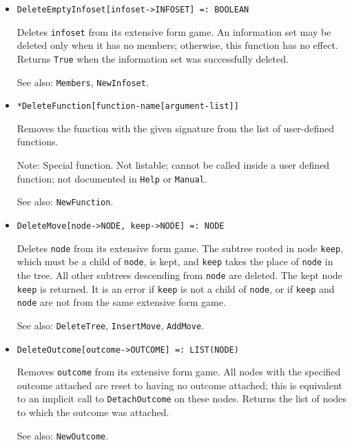 \begin{itemize}
\item{}
\protect \large \begin{verbatim}
DeleteEmptyInfoset[infoset->INFOSET] =: BOOLEAN
\end{verbatim}\normalsize

\bd
Deletes \verb+infoset+ from its extensive form game.  An information set
may be deleted only when it has no members; otherwise, this function has
no effect.  Returns \verb+True+ when the information set was successfully
deleted.
\item [See also:] \verb+Members+, \verb+NewInfoset+.
\ed

\item{}
\protect \large \begin{verbatim}
*DeleteFunction[function-name[argument-list]]
\end{verbatim}\normalsize

\bd
Removes the function with the given signature
from the list of user-defined functions.
\item [Note:] Special function. Not listable; cannot be called inside
a user defined function; not documented in \verb+Help+ or \verb+Manual+.  
\item [See also:] \verb+NewFunction+.
\ed

\item{}
\protect \large \begin{verbatim}
DeleteMove[node->NODE, keep->NODE] =: NODE
\end{verbatim}\normalsize

\bd
Deletes \verb+node+ from its extensive form game.  The
subtree rooted in node \verb+keep+, which must be a child of
\verb+node+, is kept, and \verb+keep+ takes the place of \verb+node+ in
the tree.  All other subtrees descending from \verb+node+ are deleted.
The kept node \verb+keep+ is returned.  It is an error if \verb+keep+
is not a child of \verb+node+, or if \verb+keep+ and \verb+node+ are not
from the same extensive form game.
\item [See also:] \verb+DeleteTree+, \verb+InsertMove+, \verb+AddMove+.
\ed

\item{}
\protect \large \begin{verbatim}
DeleteOutcome[outcome->OUTCOME] =: LIST(NODE)
\end{verbatim}\normalsize

\bd
Removes \verb+outcome+ from its extensive
form game.  All nodes with the specified outcome attached are reset to
having no outcome attached; this is equivalent to an implicit call to
\verb+DetachOutcome+ on these nodes.  Returns the list of nodes to which
the outcome was attached.
\item [See also:] \verb+NewOutcome+.
\ed


\end{itemize}
